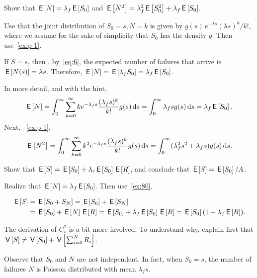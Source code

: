 \begin{exercise}
Show that $\,\mathsf{E}\left[N\right] = \lambda_f \,\mathsf{E}\left[S_0\right]$ and $\,\mathsf{E}\left[N^2\right] = \lambda_f^2 \,\mathsf{E}\left[S_0^2\right] + \lambda_f \,\mathsf{E}\left[S_0\right]$.
\begin{hint}
  Use that the joint distribution of $S_0=s, N=k$ is given by $g(s)\, e^{-\lambda s}(\lambda s)^k/k!$, where we assume for the sake of simplicity that $S_0$ has the density $g$.
  Then use~\cref{ex:p-1}.
\end{hint}
\begin{solution}
  If $S=s$, then , by~\eqref{eq:6}, the expected number of failures that arrive is $\,\mathsf{E}\left[N(s)\right] = \lambda s$.
  Therefore, $\,\mathsf{E}\left[N\right] = \,\mathsf{E}\left[\lambda_f S_0\right] = \lambda_f \,\mathsf{E}\left[S_0\right]$.

  In more detail, and with the hint, 
  \begin{equation*}
    \,\mathsf{E}\left[N\right] = \int_0^\infty \sum_{k=0}^\infty k e^{-\lambda_f s}\frac{(\lambda_f s)^k}{k!} g(s) \,\text{d}s = \int_0^\infty \lambda_f s g(s) \,\text{d}s = \lambda_f \,\mathsf{E}\left[S_0\right].
  \end{equation*}
Next, ~\cref{ex:p-1},
  \begin{equation*}
    \,\mathsf{E}\left[N^2\right] = \int_0^\infty \sum_{k=0}^\infty k^2 e^{-\lambda_f s}\frac{(\lambda_f s)^k}{k!} g(s) \,\text{d}s = \int_0^\infty (\lambda_f^2 s^2 + \lambda_f s) g(s) \,\text{d}s.
  \end{equation*}
\end{solution}
\end{exercise}


\begin{exercise}
 Show that $\,\mathsf{E}\left[S\right] = \,\mathsf{E}\left[S_0\right] + \lambda_r \,\mathsf{E}\left[S_0\right] \,\mathsf{E}\left[R\right]$, and  conclude that $\,\mathsf{E}\left[S\right] = \,\mathsf{E}\left[S_0\right]/A$.
\begin{hint}
 Realize that $\,\mathsf{E}\left[N\right] = \lambda_f \,\mathsf{E}\left[S_0\right]$. Then use~\cref{ex:80}.
\end{hint}
\begin{solution}
 \begin{align*}
   \,\mathsf{E}\left[S\right] &= \,\mathsf{E}\left[S_0 + S_N\right] = \,\mathsf{E}\left[S_0\right] + \,\mathsf{E}\left[S_N\right] \\
    &= \,\mathsf{E}\left[S_0\right] + \,\mathsf{E}\left[N\right] \,\mathsf{E}\left[R\right] = \,\mathsf{E}\left[S_0\right] + \lambda_f \,\mathsf{E}\left[S_0\right] \,\mathsf{E}\left[R\right]= \,\mathsf{E}\left[S_0\right](1+\lambda_f \,\mathsf{E}\left[R\right]).
 \end{align*}
\end{solution}
\end{exercise}


\begin{exercise}
 The derivation of $C_s^2$ is a bit more involved.
To understand why,  explain first that $\,\mathsf{V}\left[S\right] \neq \,\mathsf{V}\left[S_0\right] + \,\mathsf{V}\left[\sum_{i=0}^N R_i\right]$.
\begin{solution}
 Observe that $S_0$ and $N$ are not independent. In fact, when $S_0=s$, the number of failures $N$ is Poisson distributed with mean $\lambda_f s$. 
\end{solution}
\end{exercise}



